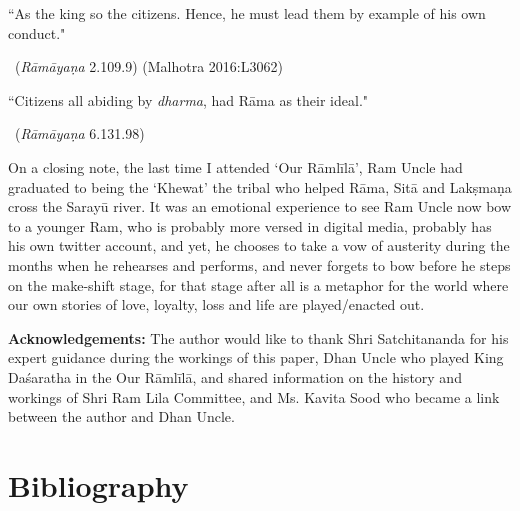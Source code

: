 \begin{myquote}
“As the king so the citizens. Hence, he must lead them by example of his own conduct." 

\vskip -5pt

~\hfill (\textit{Rāmāyaṇa} 2.109.9) (Malhotra 2016:L3062)
\end{myquote}

\vskip 4pt

\begin{myquote}
“Citizens all abiding by \textit{dharma}, had Rāma as their ideal." 

~\hfill (\textit{Rāmāyaṇa} 6.131.98)
\end{myquote}

On a closing note, the last time I attended ‘Our Rāmlīlā’, Ram Uncle had graduated to being the ‘Khewat’ the tribal who helped Rāma, Sitā and Lakṣmaṇa cross the Sarayū river. It was an emotional experience to see Ram Uncle now bow to a younger Ram, who is probably more versed in digital media, probably has his own twitter account, and yet, he chooses to take a vow of austerity during the months when he rehearses and performs, and never forgets to bow before he steps on the make-shift stage, for that stage after all is a metaphor for the world where our own stories of love, loyalty, loss and life are played/enacted out.

\newpage

\textbf{Acknowledgements:} The author would like to thank Shri Satchita\-nanda for his expert guidance during the workings of this paper, Dhan Uncle who played King Daśaratha in the Our Rāmlīlā, and shared information on the history and workings of Shri Ram Lila Committee, and Ms. Kavita Sood who became a link between the author and Dhan Uncle.


\section*{Bibliography}

